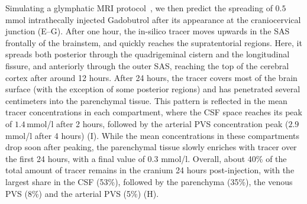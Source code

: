 \documentclass[fleqn,10pt]{wlscirep}
\newcommand{\mer}[1]{\textcolor{magenta}{#1}}
\begin{document}
Simulating a glymphatic MRI protocol~\cite{ringstad2017glymphatic,
  ringstad2018brain, eide2024functional}, we then predict the
spreading of $0.5$ mmol intrathecally injected Gadobutrol after its
appearance at the craniocervical junction
(E--G). After one hour, the in-silico
tracer moves upwards in the SAS frontally of the brainstem, and
quickly reaches the supratentorial regions. Here, it spreads both
posterior through the quadrigeminal cistern and the longitudinal
fissure, and anteriorly through the outer SAS, reaching the top of the
cerebral cortex after around 12 hours. After 24 hours, the tracer
covers most of the brain surface (with the exception of some posterior
regions) and has penetrated several centimeters into the parenchymal
tissue. This pattern is reflected in the mean tracer concentrations in
each compartment, where the CSF space reaches its peak of
$1.4\,$mmol/l after 2 hours, followed by the arterial PVS
concentration peak ($2.9\,$mmol/l after 4 hours)
(I). While the mean concentrations in these
compartments drop soon after peaking, the parenchymal tissue
slowly enriches with tracer over the first 24 hours, with a final
value of $0.3$ mmol/l. Overall, about 40\% of the total amount of
tracer remains in the cranium 24 hours post-injection, with the largest
share in the CSF (53\%), followed by the parenchyma (35\%), the
venous PVS (8\%) and the arterial PVS
(5\%) (H).

\end{document}
